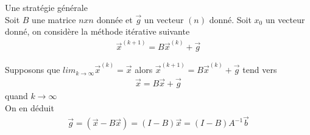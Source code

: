 Une stratégie générale\\
Soit $B$ une matrice $n x n$ donnée et $\overrightarrow g$ un vecteur $(n)$ donné. Soit $x_0$ un vecteur donné, on considère la méthode itérative suivante 
\begin{eqnarray}
	\overrightarrow x^{(k+1)}=B\overrightarrow x ^{(k)}+\overrightarrow g
\end{eqnarray}

Supposons que $lim_{k\rightarrow\infty}\overrightarrow x^{(k)}=\overrightarrow x$ alors
$\overrightarrow x^{(k+1)}=B\overrightarrow x ^{(k)}+\overrightarrow g$ tend vers 
\begin{eqnarray}
	\overrightarrow x=B\overrightarrow x+\overrightarrow g
\end{eqnarray} 
quand $k\rightarrow\infty$
\\On en déduit
\begin{eqnarray*}
	\overrightarrow g =(\overrightarrow x -B\overrightarrow x)=(I-B)\overrightarrow x=(I-B)A^{-1}\overrightarrow b
\end{eqnarray*}
	

